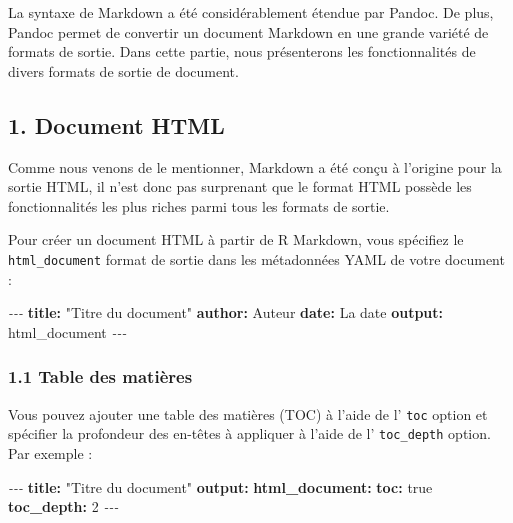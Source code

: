 \documentclass[
]{article}
\newenvironment{Shaded}{\begin{snugshade}}{\end{snugshade}}
\newcommand{\AttributeTok}[1]{\textcolor[rgb]{0.13,0.29,0.53}{#1}}
\newcommand{\CharTok}[1]{\textcolor[rgb]{0.31,0.60,0.02}{#1}}
\newcommand{\DecValTok}[1]{\textcolor[rgb]{0.00,0.00,0.81}{#1}}
\newcommand{\FunctionTok}[1]{\textcolor[rgb]{0.13,0.29,0.53}{\textbf{#1}}}
\newcommand{\KeywordTok}[1]{\textcolor[rgb]{0.13,0.29,0.53}{\textbf{#1}}}
\newcommand{\PreprocessorTok}[1]{\textcolor[rgb]{0.56,0.35,0.01}{\textit{#1}}}
\newcommand{\StringTok}[1]{\textcolor[rgb]{0.31,0.60,0.02}{#1}}
\begin{document}
La syntaxe de Markdown a été considérablement étendue par Pandoc. De
plus, Pandoc permet de convertir un document Markdown en une grande
variété de formats de sortie. Dans cette partie, nous présenterons les
fonctionnalités de divers formats de sortie de document.

\hypertarget{document-html}{%
\subsection{1. Document HTML}\label{document-html}}

Comme nous venons de le mentionner, Markdown a été conçu à l'origine
pour la sortie HTML, il n'est donc pas surprenant que le format HTML
possède les fonctionnalités les plus riches parmi tous les formats de
sortie.

Pour créer un document HTML à partir de R Markdown, vous spécifiez le
\texttt{html\_document} format de sortie dans les métadonnées YAML de
votre document :

\begin{Shaded}
\begin{Highlighting}[]
\PreprocessorTok{{-}{-}{-}}
\FunctionTok{title}\KeywordTok{:}\AttributeTok{ }\StringTok{"Titre du document"}
\FunctionTok{author}\KeywordTok{:}\AttributeTok{ Auteur}
\FunctionTok{date}\KeywordTok{:}\AttributeTok{ La date}
\FunctionTok{output}\KeywordTok{:}\AttributeTok{ html\_document}
\PreprocessorTok{{-}{-}{-}}
\end{Highlighting}
\end{Shaded}

\hypertarget{table-des-matiuxe8res}{%
\subsubsection{1.1 Table des matières}\label{table-des-matiuxe8res}}

Vous pouvez ajouter une table des matières (TOC) à l'aide de l'
\texttt{toc} option et spécifier la profondeur des en-têtes à appliquer
à l'aide de l' \texttt{toc\_depth} option. Par exemple :

\begin{Shaded}
\begin{Highlighting}[]
\PreprocessorTok{{-}{-}{-}}
\FunctionTok{title}\KeywordTok{:}\AttributeTok{ }\StringTok{"Titre du document"}
\FunctionTok{output}\KeywordTok{:}
\AttributeTok{  }\FunctionTok{html\_document}\KeywordTok{:}
\AttributeTok{    }\FunctionTok{toc}\KeywordTok{:}\AttributeTok{ }\CharTok{true}
\AttributeTok{    }\FunctionTok{toc\_depth}\KeywordTok{:}\AttributeTok{ }\DecValTok{2}
\PreprocessorTok{{-}{-}{-}}
\end{Highlighting}
\end{Shaded}
\end{document}
